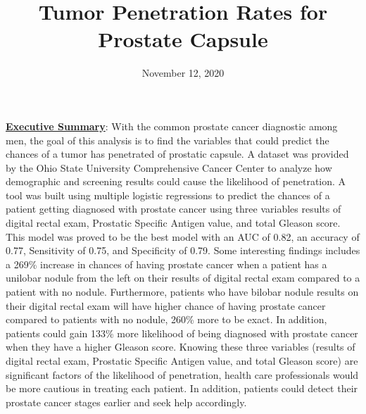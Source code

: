 \documentclass[11pt]{article}\usepackage[]{graphicx}\usepackage[]{color}
\title{Tumor Penetration Rates for Prostate Capsule\vspace{-5ex}}
\date{November 12, 2020\vspace{-5ex}}
\begin{document}
 
\maketitle
\hfill \break


















\noindent\textbf{\underline{Executive Summary}}: With the common prostate cancer diagnostic among men, the goal of this analysis is to find the variables that could predict the chances of a tumor has penetrated of prostatic capsule. A dataset was provided by the Ohio State University Comprehensive Cancer Center to analyze how demographic and screening results could cause the likelihood of penetration. A tool was built using multiple logistic regressions to predict the chances of a patient getting diagnosed with prostate cancer using three variables results of digital rectal exam, Prostatic Specific Antigen value, and total Gleason score. This model was proved to be the best model with an AUC of 0.82, an accuracy of 0.77, Sensitivity of 0.75, and Specificity of 0.79. Some interesting findings includes a 269\% increase in chances of having prostate cancer when a patient has a unilobar nodule from the left on their results of digital rectal exam compared to a patient with no nodule. Furthermore, patients who have bilobar nodule results on their digital rectal exam will have higher chance of having prostate cancer compared to patients with no nodule, 260\% more to be exact. In addition, patients could gain 133\% more likelihood of being diagnosed with prostate cancer when they have a higher Gleason score. Knowing these three variables (results of digital rectal exam, Prostatic Specific Antigen value, and total Gleason score) are significant factors of the likelihood of penetration, health care professionals would be more cautious in treating each patient. In addition, patients could detect their prostate cancer stages earlier and seek help accordingly.      
\hfill \break
\end{document}
